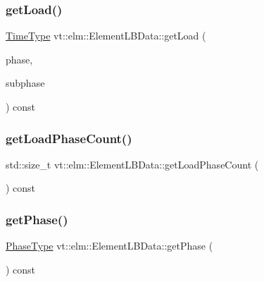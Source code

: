\mbox{\label{structvt_1_1elm_1_1_element_l_b_data_a982939f9ddd9422c5ec9654112084108}} 
\subsubsection{\texorpdfstring{get\+Load()}{getLoad()}\hspace{0.1cm}{\footnotesize\ttfamily [2/2]}}
{\footnotesize\ttfamily \hyperlink{namespacevt_a876a9d0cd5a952859c72de8a46881442}{Time\+Type} vt\+::elm\+::\+Element\+L\+B\+Data\+::get\+Load (\begin{DoxyParamCaption}\item[{\hyperlink{namespacevt_a46ce6733d5cdbd735d561b7b4029f6d7}{Phase\+Type}}]{phase,  }\item[{\hyperlink{namespacevt_ae78cbfdf1e57470e33eedb074f2beeba}{Subphase\+Type}}]{subphase }\end{DoxyParamCaption}) const}

\mbox{\label{structvt_1_1elm_1_1_element_l_b_data_a2caf9adf8c33a1d2dda021388b84bb00}} 
\subsubsection{\texorpdfstring{get\+Load\+Phase\+Count()}{getLoadPhaseCount()}}
{\footnotesize\ttfamily std\+::size\+\_\+t vt\+::elm\+::\+Element\+L\+B\+Data\+::get\+Load\+Phase\+Count (\begin{DoxyParamCaption}{ }\end{DoxyParamCaption}) const}

\mbox{\label{structvt_1_1elm_1_1_element_l_b_data_ab3e11f3720c9c8ce83b23610eccbef08}} 
\subsubsection{\texorpdfstring{get\+Phase()}{getPhase()}}
{\footnotesize\ttfamily \hyperlink{namespacevt_a46ce6733d5cdbd735d561b7b4029f6d7}{Phase\+Type} vt\+::elm\+::\+Element\+L\+B\+Data\+::get\+Phase (\begin{DoxyParamCaption}{ }\end{DoxyParamCaption}) const}

